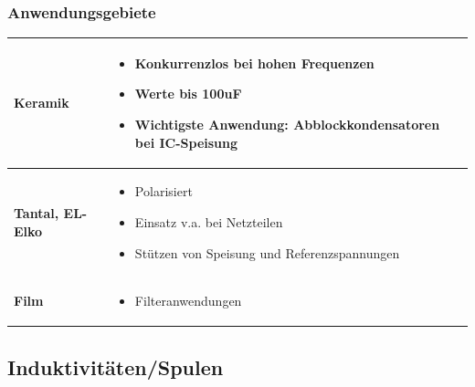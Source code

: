 \subsubsection{Anwendungsgebiete}
\begin{longtable}{|l|l|}
\hline
\begin{minipage}{4cm}
\textbf{Keramik}
\end{minipage}
&
\begin{minipage}{6cm}
\begin{itemize}
  \item Konkurrenzlos bei hohen Frequenzen
  \item Werte bis 100uF
  \item Wichtigste Anwendung: Abblockkondensatoren bei IC-Speisung
\end{itemize}
\end{minipage}
\\
\hline
\begin{minipage}{4cm}
\textbf{Tantal, EL-Elko}
\end{minipage}
&
\begin{minipage}{6cm}
\begin{itemize}
  \item Polarisiert
  \item Einsatz v.a. bei Netzteilen
  \item Stützen von Speisung und Referenzspannungen
\end{itemize}
\end{minipage}
\\
\hline
\begin{minipage}{4cm}
\textbf{Film}
\end{minipage}
&
\begin{minipage}{6cm}
\begin{itemize}
  \item Filteranwendungen
\end{itemize}
\end{minipage}
\\
\hline
\end{longtable}

\subsection{Induktivitäten/Spulen}

